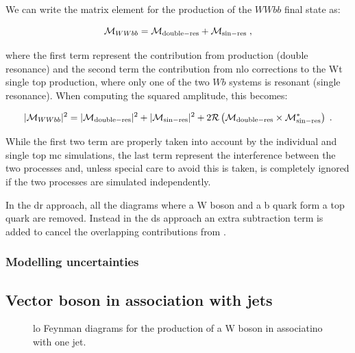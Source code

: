We can write the matrix element for the production of the $WWbb$ final state as:

\begin{equation}
\mathcal{M}_{WWbb} = \mathcal{M}_{\rm{double-res}} + \mathcal{M}_{\rm{sin-res}} \; ,
\end{equation}

\noindent where the first term represent the contribution from \ttbar production (double resonance) and the second term the contribution from 
\gls{nlo} corrections to the Wt single top production, where only one of the two $Wb$ systems is resonant (single resonance). 
When computing the squared amplitude, this becomes:

\begin{equation}
|\mathcal{M}_{WWbb}|^2 = |\mathcal{M}_{\rm{double-res}}|^2 + |\mathcal{M}_{\rm{sin-res}}|^2 + 2 \mathcal{R}\left(\mathcal{M}_{\rm{double-res}}\times \mathcal{M}_{\rm{sin-res}}^* \right) \; .
\end{equation}

While the first two term are properly taken into account by the individual \ttbar and single top \gls{mc} simulations, 
the last term represent the interference between the two processes and, unless special care to avoid this is taken, is completely ignored if the two processes are simulated independently. 

In the \gls{dr} approach, all the diagrams where a W boson and a b quark form a top quark are removed. 
Instead in the \gls{ds} approach an extra subtraction term is added to cancel the overlapping contributions from \ttbar. 


\subsubsection*{Modelling uncertainties}


\subsection{Vector boson in association with jets}


\begin{figure}[h]
\centering 
{}
\caption{\gls{lo} Feynman diagrams for the production of a W boson in associatino with one jet.}\label{fig:W_prod}
\end{figure}

